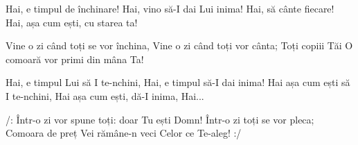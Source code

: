 \beginverse
Hai, e timpul de închinare!
Hai, vino să-I dai Lui inima!
Hai, să cânte fiecare!
Hai, așa cum ești, cu starea ta!
\endverse

\beginchorus
Vine o zi când toți se vor închina,
Vine o zi când toți vor cânta;
Toți copiii Tăi
O comoară vor primi din mâna Ta!
\endchorus

\beginverse
Hai, e timpul Lui să I te-nchini,
Hai, e timpul să-I dai inima!
Hai așa cum ești să I te-nchini,
Hai așa cum ești, dă-I inima,
Hai...
\endverse

\beginchorus
/: Într-o zi vor spune toți: doar Tu ești Domn!
Într-o zi toți se vor pleca;
Comoara de preț Vei rămâne-n veci
Celor ce Te-aleg! :/
\endchorus
\endsong